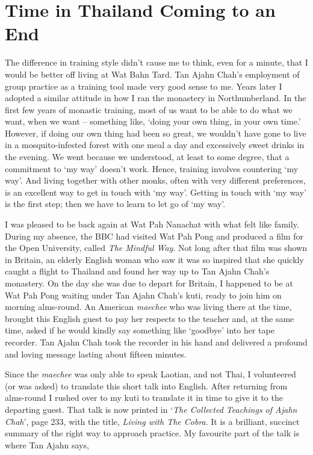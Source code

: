 \chapter{Time in Thailand Coming to an End}

The difference in training style didn't cause me to think, even for a
minute, that I would be better off living at Wat Bahn Tard. Tan Ajahn
Chah's employment of group practice as a training tool made very good
sense to me. Years later I adopted a similar attitude in how I ran the
monastery in Northumberland. In the first few years of monastic
training, most of us want to be able to do what we want, when we want --
something like, `doing your own thing, in your own time.' However, if
doing our own thing had been so great, we wouldn't have gone to live in
a mosquito-infested forest with one meal a day and excessively sweet
drinks in the evening. We went because we understood, at least to some
degree, that a commitment to `my way' doesn't work. Hence, training
involves countering `my way'. And living together with other monks,
often with very different preferences, is an excellent way to get in
touch with `my way'. Getting in touch with `my way' is the first step;
then we have to learn to let go of `my way'.

I was pleased to be back again at Wat Pah Nanachat with what felt like
family. During my absence, the BBC had visited Wat Pah Pong and produced
a film for the Open University, called \emph{The Mindful Way}. Not long
after that film was shown in Britain, an elderly English woman who saw
it was so inspired that she quickly caught a flight to Thailand and
found her way up to Tan Ajahn Chah's monastery. On the day she was due
to depart for Britain, I happened to be at Wat Pah Pong waiting under
Tan Ajahn Chah's kuti, ready to join him on morning alms-round. An
American \emph{maechee} who was living there at the time, brought this
English guest to pay her respects to the teacher and, at the same time,
asked if he would kindly say something like `goodbye' into her tape
recorder. Tan Ajahn Chah took the recorder in his hand and delivered a
profound and loving message lasting about fifteen minutes.

Since the \emph{maechee} was only able to speak Laotian, and not Thai, I
volunteered (or was asked) to translate this short talk into English.
After returning from alms-round I rushed over to my kuti to translate it
in time to give it to the departing guest. That talk is now printed in
`\emph{The Collected Teachings of Ajahn Chah}\cite{collected}',
page 233, with the title,
\emph{Living with The Cobra}. It is a brilliant, succinct summary of the
right way to approach practice. My favourite part of the talk is where
Tan Ajahn says,

